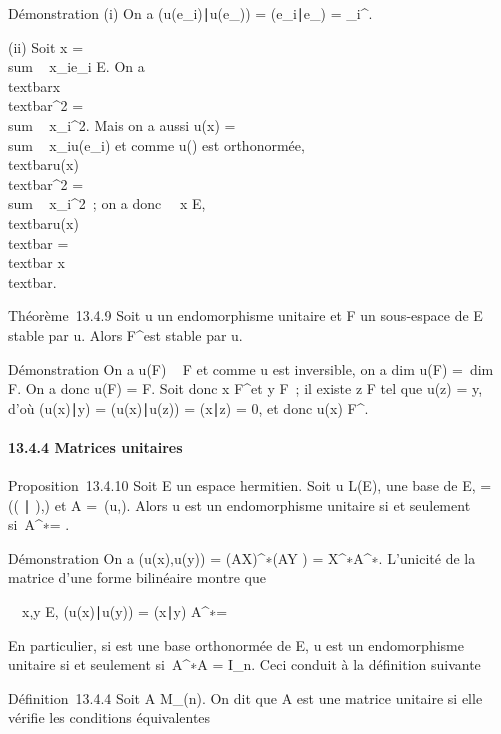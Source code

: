 \documentclass[]{article}
\begin{document}
Démonstration (i) On a
(u(e\_i)∣u(e\_\jmath)) =
(e\_i∣e\_\jmath) =
\delta\_i^\jmath.

(ii) Soit x = \\sum ~
x\_ie\_i \in E. On a
\\textbar{}x\\textbar{}^2
= \\sum ~
\textbar{}x\_i\textbar{}^2. Mais on a aussi u(x)
= \\sum ~
x\_iu(e\_i) et comme u() est orthonormée,
\\textbar{}u(x)\\textbar{}^2
= \\sum ~
\textbar{}x\_i\textbar{}^2~; on a donc
\forall~~x \in E,
\\textbar{}u(x)\\textbar{}
=\\textbar{} x\\textbar{}.

Théorème~13.4.9 Soit u un endomorphisme unitaire et F un sous-espace de
E stable par u. Alors F^\bot est stable par u.

Démonstration On a u(F) \subset~ F et comme u est inversible, on a
dim u(F) =\ dim~ F. On
a donc u(F) = F. Soit donc x \in F^\bot et y \in F~; il existe z \in F
tel que u(z) = y, d'où (u(x)∣y) =
(u(x)∣u(z)) =
(x∣z) = 0, et donc u(x) \in F^\bot.

\paragraph{13.4.4 Matrices unitaires}

Proposition~13.4.10 Soit E un espace hermitien. Soit u \in L(E),  une
base de E, \Omega = \mathrmMat~
(( ∣ ),) et A =\
\mathrmMat (u,). Alors u est un endomorphisme
unitaire si et seulement si~A^∗\OmegaA = \Omega.

Démonstration On a \phi(u(x),u(y)) = (AX)^∗\Omega(AY ) =
X^∗A^∗\OmegaAY . L'unicité de la matrice d'une forme
bilinéaire montre que

\forall~~x,y \in E,
(u(x)∣u(y)) =
(x∣y) \mathrel\Leftrightarrow
A^∗\OmegaA = \Omega

En particulier, si  est une base orthonormée de E, u est un
endomorphisme unitaire si et seulement si~A^∗A =
I\_n. Ceci conduit à la définition suivante

Définition~13.4.4 Soit A \in M\_(n). On dit que A est une matrice
unitaire si elle vérifie les conditions équivalentes
\end{document}
